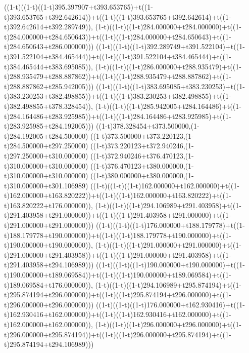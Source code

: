 ((1-t)((1-t)((1-t)395.397907+t393.653765)+t((1-t)393.653765+t392.642614))+t((1-t)((1-t)393.653765+t392.642614)+t((1-t)392.642614+t392.289749)),                                     (1-t)((1-t)((1-t)284.000000+t284.000000)+t((1-t)284.000000+t284.650643))+t((1-t)((1-t)284.000000+t284.650643)+t((1-t)284.650643+t286.000000)))
((1-t)((1-t)((1-t)392.289749+t391.522104)+t((1-t)391.522104+t384.465444))+t((1-t)((1-t)391.522104+t384.465444)+t((1-t)384.465444+t383.695085)),                                     (1-t)((1-t)((1-t)286.000000+t288.935479)+t((1-t)288.935479+t288.887862))+t((1-t)((1-t)288.935479+t288.887862)+t((1-t)288.887862+t285.942005)))
((1-t)((1-t)((1-t)383.695085+t383.230253)+t((1-t)383.230253+t382.498855))+t((1-t)((1-t)383.230253+t382.498855)+t((1-t)382.498855+t378.328454)),                                     (1-t)((1-t)((1-t)285.942005+t284.164486)+t((1-t)284.164486+t283.925985))+t((1-t)((1-t)284.164486+t283.925985)+t((1-t)283.925985+t284.192005)))
((1-t)378.328454+t373.500000,(1-t)284.192005+t284.500000)
((1-t)373.500000+t373.220123,(1-t)284.500000+t297.250000)
((1-t)373.220123+t372.940246,(1-t)297.250000+t310.000000)
((1-t)372.940246+t376.470123,(1-t)310.000000+t310.000000)
((1-t)376.470123+t380.000000,(1-t)310.000000+t310.000000)
((1-t)380.000000+t380.000000,(1-t)310.000000+t301.106989)
((1-t)((1-t)((1-t)162.000000+t162.000000)+t((1-t)162.000000+t163.820222))+t((1-t)((1-t)162.000000+t163.820222)+t((1-t)163.820222+t176.000000)),                                     (1-t)((1-t)((1-t)294.106989+t291.403958)+t((1-t)291.403958+t291.000000))+t((1-t)((1-t)291.403958+t291.000000)+t((1-t)291.000000+t291.000000)))
((1-t)((1-t)((1-t)176.000000+t188.179778)+t((1-t)188.179778+t190.000000))+t((1-t)((1-t)188.179778+t190.000000)+t((1-t)190.000000+t190.000000)),                                     (1-t)((1-t)((1-t)291.000000+t291.000000)+t((1-t)291.000000+t291.403958))+t((1-t)((1-t)291.000000+t291.403958)+t((1-t)291.403958+t294.106989)))
((1-t)((1-t)((1-t)190.000000+t190.000000)+t((1-t)190.000000+t189.069584))+t((1-t)((1-t)190.000000+t189.069584)+t((1-t)189.069584+t176.000000)),                                     (1-t)((1-t)((1-t)294.106989+t295.874194)+t((1-t)295.874194+t296.000000))+t((1-t)((1-t)295.874194+t296.000000)+t((1-t)296.000000+t296.000000)))
((1-t)((1-t)((1-t)176.000000+t162.930416)+t((1-t)162.930416+t162.000000))+t((1-t)((1-t)162.930416+t162.000000)+t((1-t)162.000000+t162.000000)),                                     (1-t)((1-t)((1-t)296.000000+t296.000000)+t((1-t)296.000000+t295.874194))+t((1-t)((1-t)296.000000+t295.874194)+t((1-t)295.874194+t294.106989)))
